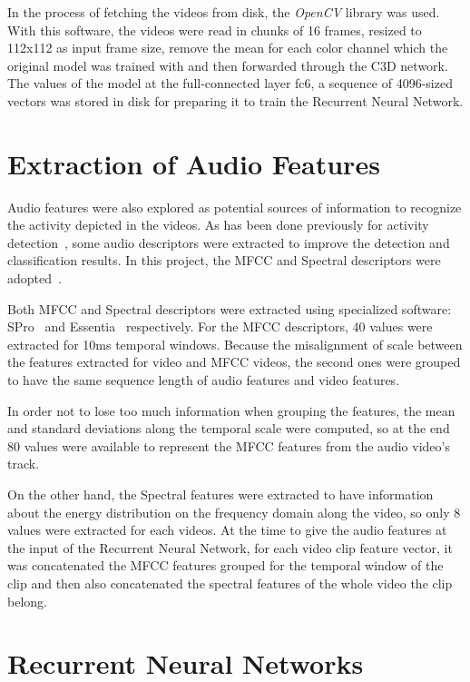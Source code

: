 In the process of fetching the videos from disk, the \textit{OpenCV}\cite{opencv_library} library was used. With this software, the videos were read in chunks of 16 frames, resized to 112x112 as input frame size, remove the mean for each color channel which the original model was trained with and then forwarded through the C3D network. The values of the model at the full-connected layer fc6, a sequence of 4096-sized vectors was stored in disk for preparing it to train the Recurrent Neural Network. %

\section{Extraction of Audio Features}

Audio features were also explored as potential sources of information to recognize the activity depicted in the videos. As has been done previously for activity detection~\cite{xu2015uts}, some audio descriptors were extracted to improve the detection and classification results. In this project, the MFCC and Spectral descriptors were adopted~\cite{heittola2013context}. 

Both MFCC and Spectral descriptors were extracted using specialized software: SPro~\cite{gravier2010spro} and Essentia~\cite{bogdanov2013essentia} respectively. For the MFCC descriptors, 40 values were extracted for 10ms temporal windows. Because the misalignment of scale between the features extracted for video and MFCC videos, the second ones were grouped to have the same sequence length of audio features and video features. 

In order not to lose too much information when grouping the features, the mean and standard deviations along the temporal scale were computed, so at the end 80 values were available to represent the MFCC features from the audio video's track.

On the other hand, the Spectral features were extracted to have information about the energy distribution on the frequency domain along the video, so only 8 values were extracted for each videos. At the time to give the audio features at the input of the Recurrent Neural Network, for each video clip feature vector, it was concatenated the MFCC features grouped for the temporal window of the clip and then also concatenated the spectral features of the whole video the clip belong. 

\section{Recurrent Neural Networks}

